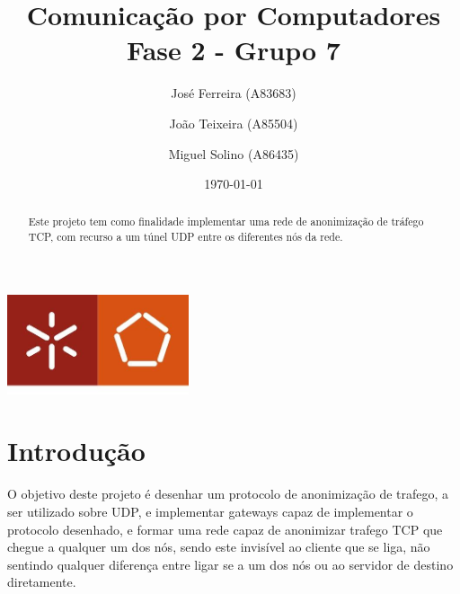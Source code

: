 \documentclass[a4paper]{report}
\begin{document}
\title{Comunicação por Computadores\\ 
\large Fase 2 - Grupo 7}
\author{José Ferreira (A83683) \and João Teixeira (A85504) \and Miguel Solino (A86435)}
\date{\today}

\begin{center}
    \begin{minipage}{0.75\linewidth}
        \centering
        \includegraphics[width=0.4\textwidth]{images/eng.jpeg}\par\vspace{1cm}
        \vspace{1.5cm}
        \href{https://www.uminho.pt/PT}
        {\color{black}{\scshape\LARGE Universidade do Minho}} \par
        \vspace{1cm}
        \href{https://www.di.uminho.pt/}
        {\color{black}{\scshape\Large Departamento de Informática}} \par
        \vspace{1.5cm}
        \maketitle
    \end{minipage}
\end{center}

\pagebreak

\begin{abstract}
    \begin{center}
        Este projeto tem como finalidade implementar uma rede de anonimização de
        tráfego TCP, com recurso a um túnel UDP entre os diferentes nós da rede.
    \end{center}
\end{abstract}

\tableofcontents

\chapter{Introdução}

O objetivo deste projeto é desenhar um protocolo de anonimização de trafego,
a ser utilizado sobre UDP, e implementar gateways capaz de implementar o 
protocolo desenhado, e formar uma rede capaz de anonimizar trafego TCP que
chegue a qualquer um dos nós, sendo este invisível ao cliente que se liga,
não sentindo qualquer diferença entre ligar se a um dos nós ou ao servidor
de destino diretamente.
\end{document}
